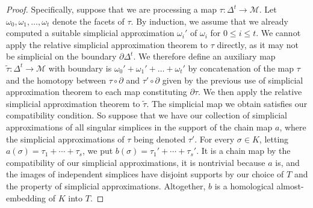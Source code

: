\documentclass[11pt]{article}
\newcommand{\M}{\mathcal{M}}
\begin{document}
\begin{proof}
%
\medskip
%
Specifically, suppose that we are processing a map $\tau:\Delta^t\to \M$. Let $\omega_0,\omega_1, \ldots, \omega_t$ denote the facets of $\tau$. By induction, we assume that we already computed a suitable simplicial approximation $\omega_i'$ of $\omega_i$ for $0 \le i \le t$. We cannot apply the relative simplicial approximation theorem to $\tau$ directly, as it may not be simplicial on the boundary $\partial \Delta^t$. We therefore define an auxiliary map $\widetilde \tau:\Delta^t\to\M$ with boundary is $\omega_0'+ \omega_1' + \ldots+\omega_t'$ by concatenation of the map $\tau$ and the homotopy between $\tau\circ\partial$ and $\tau'\circ\partial$ given by the previous use of simplicial approximation theorem to each map constituting $\partial\tau$. We then apply the relative simplicial approximation theorem to  $\widetilde \tau$. The simplicial map we obtain satisfies our compatibility condition.
%
\medskip
%
So suppose that we have our collection of simplicial approximations of all singular simplices in the support of the chain map $a$, where the simplicial approximations of $\tau$ being denoted $\tau'$. For every $\sigma\in K$, letting $a(\sigma)=\tau_1+\cdots+\tau_s$, we put $b(\sigma)=\tau_1'+\cdots+\tau_s'$. It is a chain map by the compatibility of our simplicial approximations, it is nontrivial because $a$ is, and the images of independent simplices have disjoint supports by our choice of $T$ and the property of simplicial approximations. Altogether, $b$ is a homological almost-embedding of $K$ into $T$.
\end{proof}
%
%
\end{document}
